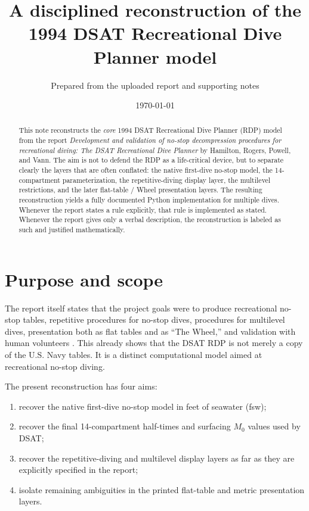 \documentclass[11pt]{article}
\title{A disciplined reconstruction of the 1994 DSAT Recreational Dive Planner model}
\author{Prepared from the uploaded report and supporting notes}
\date{\today}
\begin{document}
\maketitle

\begin{abstract}
This note reconstructs the \emph{core} 1994 DSAT Recreational Dive Planner (RDP) model from the report
\emph{Development and validation of no-stop decompression procedures for recreational diving: The DSAT Recreational Dive Planner} by Hamilton, Rogers, Powell, and Vann. The aim is not to defend the RDP as a life-critical device, but to separate clearly the layers that are often conflated: the native first-dive no-stop model, the 14-compartment parameterization, the repetitive-diving display layer, the multilevel restrictions, and the later flat-table / Wheel presentation layers. The resulting reconstruction yields a fully documented Python implementation for multiple dives. Whenever the report states a rule explicitly, that rule is implemented as stated. Whenever the report gives only a verbal description, the reconstruction is labeled as such and justified mathematically.
\end{abstract}

\section{Purpose and scope}

The report itself states that the project goals were to produce recreational no-stop tables, repetitive procedures for no-stop dives, procedures for multilevel dives, presentation both as flat tables and as ``The Wheel,'' and validation with human volunteers \cite[p.~19]{Hamilton1994}. This already shows that the DSAT RDP is not merely a copy of the U.S. Navy tables. It is a distinct computational model aimed at recreational no-stop diving.

The present reconstruction has four aims:
\begin{enumerate}[label=\arabic*.]
\item recover the native first-dive no-stop model in feet of seawater (fsw);
\item recover the final 14-compartment half-times and surfacing $M_0$ values used by DSAT;
\item recover the repetitive-diving and multilevel display layers as far as they are explicitly specified in the report;
\item isolate remaining ambiguities in the printed flat-table and metric presentation layers.
\end{enumerate}
\end{document}

